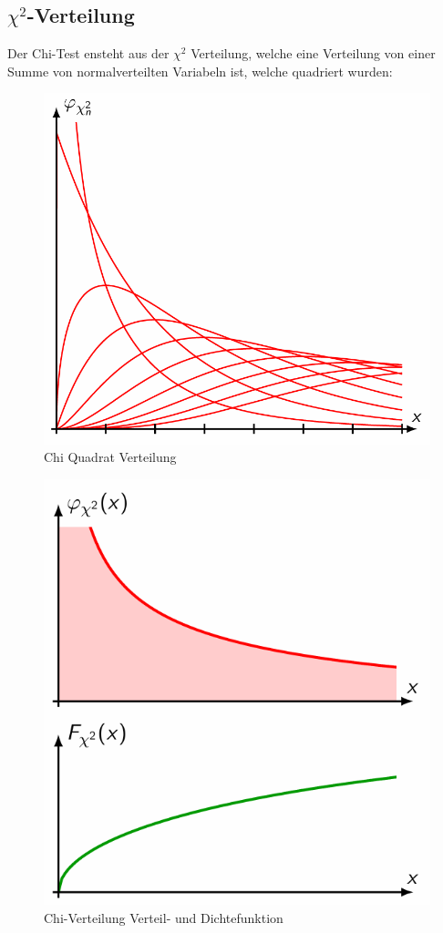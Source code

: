 \documentclass[../Main.tex]{subfiles}
\begin{document}
\subsection{\(\chi^2\)-Verteilung}
Der Chi-Test ensteht aus der \(\chi^2\) Verteilung, welche eine Verteilung von
einer Summe von normalverteilten Variabeln ist, welche quadriert wurden:

\begin{figure}[H]
    \centering
    \includegraphics[width=0.5\linewidth]{Images/x-verteilung.png}
    \caption{Chi Quadrat Verteilung}
\end{figure}


\begin{figure}[H]
    \centering
    \includegraphics[width=0.5\linewidth]{Images/chi-verteilung.png}
    \caption{Chi-Verteilung Verteil- und Dichtefunktion}
\end{figure}
\end{document}
